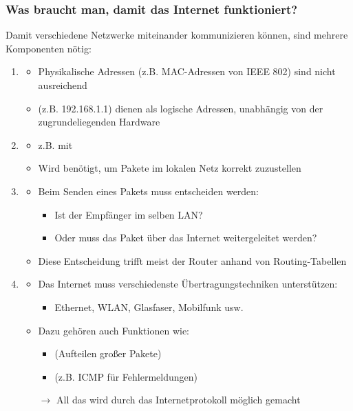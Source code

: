 \subsubsection*{Was braucht man, damit das Internet funktioniert?}
Damit verschiedene Netzwerke miteinander kommunizieren können, sind mehrere Komponenten nötig:
\begin{enumerate}
    \item {}
    \begin{itemize}
        \item Physikalische Adressen (z.B. MAC-Adressen von IEEE 802) sind nicht ausreichend
        \item {} (z.B. 192.168.1.1) dienen als logische Adressen, unabhängig von der zugrundeliegenden Hardware
    \end{itemize}
    \item {}
    \begin{itemize}
        \item z.B. mit 
        \item Wird benötigt, um Pakete im lokalen Netz korrekt zuzustellen
    \end{itemize}
    \item {}
    \begin{itemize}
        \item Beim Senden eines Pakets muss entscheiden werden:
        \begin{itemize}
            \item Ist der Empfänger im selben LAN?
            \item Oder muss das Paket über das Internet weitergeleitet werden?
        \end{itemize}
        \item Diese Entscheidung trifft meist der Router anhand von Routing-Tabellen
    \end{itemize}
    \item {}
    \begin{itemize}
        \item Das Internet muss verschiedenste Übertragungstechniken unterstützen:
        \begin{itemize}
            \item Ethernet, WLAN, Glasfaser, Mobilfunk usw.
        \end{itemize}
        \item Dazu gehören auch Funktionen wie:
        \begin{itemize}
            \item {} (Aufteilen großer Pakete)
            \item {} (z.B. ICMP für Fehlermeldungen)
        \end{itemize}
        $\rightarrow$ All das wird durch das Internetprotokoll  möglich gemacht
    \end{itemize}
\end{enumerate}
